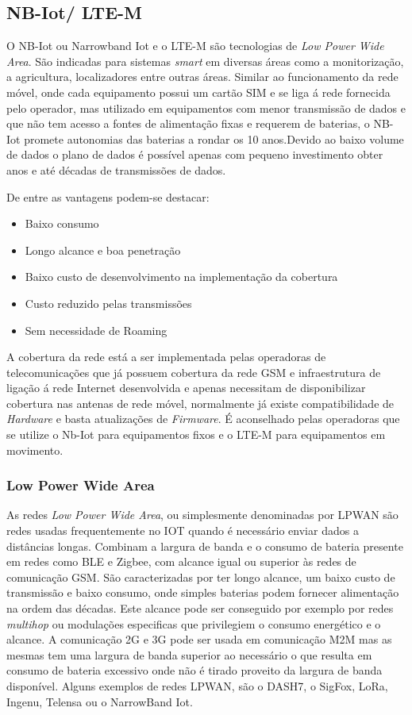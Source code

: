 \subsection {NB-Iot/ LTE-M}
O NB-Iot ou Narrowband Iot e o LTE-M são tecnologias de \textit{Low Power Wide Area}. São indicadas para sistemas \textit{smart} em diversas áreas como a monitorização, a agricultura, localizadores entre outras áreas. Similar ao funcionamento da rede móvel, onde cada equipamento possui um cartão SIM e se liga á rede fornecida pelo operador, mas utilizado em equipamentos com menor transmissão de dados e que não tem acesso a fontes de alimentação fixas e requerem de baterias, o NB-Iot promete autonomias das baterias a rondar os 10 anos\cite{u_2017}.Devido ao baixo volume de dados o plano de dados é possível apenas com pequeno investimento obter anos e até décadas de transmissões de dados.
\par De entre as vantagens podem-se destacar:
\begin{itemize}
\item Baixo consumo
\item Longo alcance e boa penetração
\item Baixo custo de desenvolvimento na implementação da cobertura
\item Custo reduzido pelas transmissões
\item Sem necessidade de Roaming
\end{itemize}
\par
A cobertura da rede está a ser implementada pelas operadoras de telecomunicações que já possuem cobertura da rede GSM e infraestrutura de ligação á rede Internet desenvolvida e apenas necessitam de 
disponibilizar cobertura nas antenas de rede móvel, normalmente já existe compatibilidade de \textit{Hardware} e basta atualizações de \textit{Firmware}. É aconselhado pelas operadoras que se utilize o Nb-Iot para equipamentos fixos e o LTE-M para equipamentos em movimento.

\subsubsection { Low Power Wide Area}
As redes \textit{Low Power Wide Area}, ou simplesmente denominadas por LPWAN são redes usadas frequentemente no IOT quando é necessário enviar dados a distâncias longas. Combinam a largura de banda e o consumo de bateria presente em redes como BLE e Zigbee, com alcance igual ou superior às redes de comunicação GSM. São caracterizadas por ter longo alcance, um baixo custo de transmissão e baixo consumo, onde simples baterias podem fornecer alimentação na ordem das décadas. Este alcance pode ser conseguido por exemplo por redes \textit{multihop} ou modulações especificas que privilegiem o consumo energético e o alcance. A comunicação 2G e 3G pode ser usada em comunicação M2M mas as mesmas tem uma largura de banda superior ao necessário o que resulta em consumo de bateria excessivo onde não é tirado proveito da largura de banda disponível. Alguns exemplos de redes LPWAN, são o DASH7, o SigFox, LoRa, Ingenu, Telensa ou o NarrowBand Iot.\cite{lpwanoverview}

